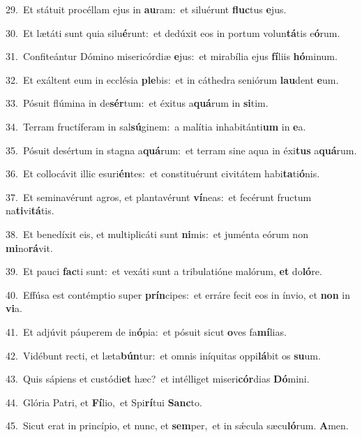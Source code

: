 {\numbfont\textcolor{\numbcolor}{29.}}~Et státuit procéllam ejus in \textbf{au}\-ram:~\star et siluérunt \textbf{fluc}\-tus \textbf{e}\-jus.\par
{\numbfont\textcolor{\numbcolor}{30.}}~Et lætáti sunt quia silu\-\textbf{é}\-runt:~\star et dedúxit eos in portum volun\-\textbf{tá}\-tis e\-\textbf{ó}\-rum.\par
{\numbfont\textcolor{\numbcolor}{31.}}~Confiteántur Dómino misericórdiæ \textbf{e}\-jus:~\star et mirabília ejus \textbf{fí}\-liis \textbf{hó}\-minum.\par
{\numbfont\textcolor{\numbcolor}{32.}}~Et exáltent eum in ecclésia \textbf{ple}\-bis:~\star et in cáthedra seniórum \textbf{lau}\-dent \textbf{e}\-um.\par
{\numbfont\textcolor{\numbcolor}{33.}}~Pósuit flúmina in de\-\textbf{sér}\-tum:~\star et éxitus a\-\textbf{quá}\-rum in \textbf{si}\-tim.\par
{\numbfont\textcolor{\numbcolor}{34.}}~Terram fructíferam in sal\-\textbf{sú}\-ginem:~\star a malítia inhabitánti\textbf{um} in \textbf{e}\-a.\par
{\numbfont\textcolor{\numbcolor}{35.}}~Pósuit desértum in stagna a\-\textbf{quá}\-rum:~\star et terram sine aqua in éxi\textbf{tus} a\-\textbf{quá}\-rum.\par
{\numbfont\textcolor{\numbcolor}{36.}}~Et collocávit illic esuri\-\textbf{én}\-tes:~\star et constituérunt civitátem habi\-\textbf{ta}\-ti\-\textbf{ó}\-nis.\par
{\numbfont\textcolor{\numbcolor}{37.}}~Et seminavérunt agros, et plantavérunt \textbf{ví}\-neas:~\star et fecérunt fructum na\-\textbf{ti}\-vi\-\textbf{tá}\-tis.\par
{\numbfont\textcolor{\numbcolor}{38.}}~Et benedíxit eis, et multiplicáti sunt \textbf{ni}\-mis:~\star et juménta eórum non \textbf{mi}\-no\-\textbf{rá}\-vit.\par
{\numbfont\textcolor{\numbcolor}{39.}}~Et pauci \textbf{fac}\-ti sunt:~\star et vexáti sunt a tribulatióne malórum, \textbf{et} do\-\textbf{ló}\-re.\par
{\numbfont\textcolor{\numbcolor}{40.}}~Effúsa est contémptio super \textbf{prín}\-cipes:~\star et erráre fecit eos in ínvio, et \textbf{non} in \textbf{vi}\-a.\par
{\numbfont\textcolor{\numbcolor}{41.}}~Et adjúvit páuperem de in\-\textbf{ó}\-pia:~\star et pósuit sicut \textbf{o}\-ves fa\-\textbf{mí}\-lias.\par
{\numbfont\textcolor{\numbcolor}{42.}}~Vidébunt recti, et læta\-\textbf{bún}\-tur:~\star et omnis iníquitas oppi\-\textbf{lá}\-bit os \textbf{su}\-um.\par
{\numbfont\textcolor{\numbcolor}{43.}}~Quis sápiens et custódi\textbf{et} hæc?~\star et intélliget miseri\-\textbf{cór}\-dias \textbf{Dó}\-mini.\par
{\numbfont\textcolor{\numbcolor}{44.}}~Glória Patri, et \textbf{Fí}\-lio,~\star et Spi\-\textbf{rí}\-tui \textbf{Sanc}\-to.\par
{\numbfont\textcolor{\numbcolor}{45.}}~Sicut erat in princípio, et nunc, et \textbf{sem}\-per,~\star et in sǽcula sæcu\-\textbf{ló}\-rum. \textbf{A}\-men.\par
